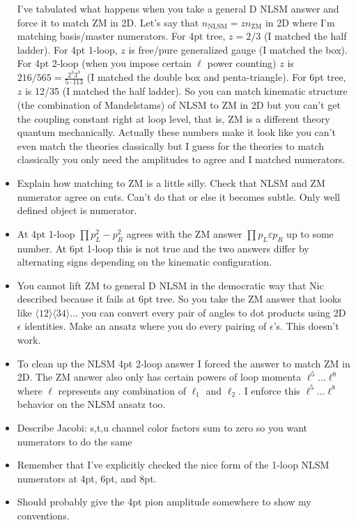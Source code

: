 \documentclass[11pt,letter]{article}
\def\eps{\varepsilon}
\begin{document}
\begin{itemize}
I've tabulated what happens when you take a general D NLSM answer and force it to match ZM in 2D.
Let's say that $n_\text{NLSM} = z n_\text{ZM}$ in 2D where I'm matching basis/master numerators.
For 4pt tree, $z=2/3$ (I matched the half ladder).
For 4pt 1-loop, $z$ is free/pure generalized gauge (I matched the box).
For 4pt 2-loop (when you impose certain $\ell$ power counting) $z$ is $216/565=\tfrac{2^3 3^3}{5 \cdot 113}$ (I matched the double box and penta-triangle).
For 6pt tree, $z$ is 12/35 (I matched the half ladder).
So you can match kinematic structure (the combination of Mandelstams) of NLSM to ZM in 2D but you can't get the coupling constant right at loop level, that is, ZM is a different theory quantum mechanically.
Actually these numbers make it look like you can't even match the theories classically but I guess for the theories to match classically you only need the amplitudes to agree and I matched numerators.
\item Explain how matching to ZM is a little silly.
Check that NLSM and ZM numerator agree on cuts.
Can't do that or else it becomes subtle.
Only well defined object is numerator.
\item At 4pt 1-loop $\prod p_L^2 -p_R^2$ agrees with the ZM answer $\prod p_L \eps p_R$ up to some number.
At 6pt 1-loop this is not true and the two answers differ by alternating signs depending on the kinematic configuration.
\item You cannot lift ZM to general D NLSM in the democratic way that Nic described because it fails at 6pt tree.  So you take the ZM answer that looks like $\langle 1 2\rangle \langle 3 4\rangle...$ you can convert every pair of angles to dot products using 2D $\epsilon$ identities.  Make an ansatz where you do every pairing of $\epsilon$'s.  This doesn't work.
\item To clean up the NLSM 4pt 2-loop answer I forced the answer to match ZM in 2D.
The ZM answer also only has certain powers of loop momenta $\ell^5$...$\ell^8$ where $\ell$ represents any combination of $\ell_1$ and $\ell_2$.
I enforce this $\ell^5$...$\ell^8$ behavior on the NLSM ansatz too.
\item Describe Jacobi:  s,t,u channel color factors sum to zero so you want numerators to do the same
\item Remember that I've explicitly checked the nice form of the 1-loop NLSM numerators at 4pt, 6pt, and 8pt.
\item Should probably give the 4pt pion amplitude somewhere to show my conventions.
\end{itemize}
\end{document}
